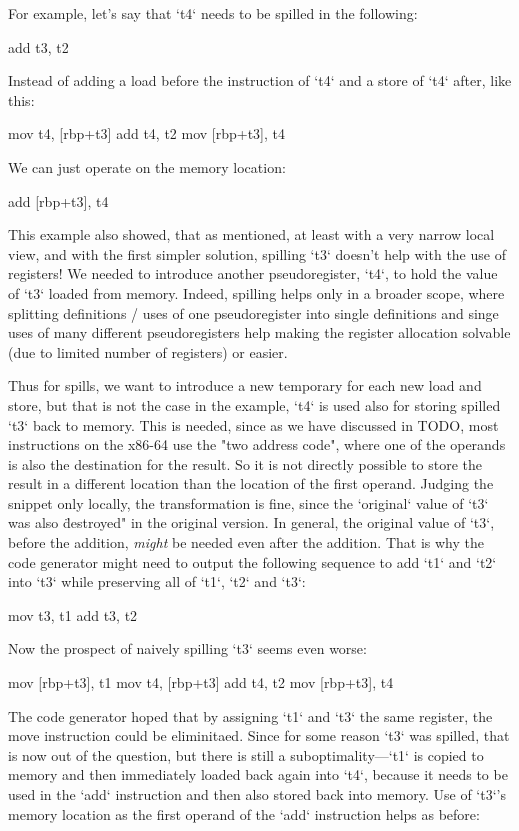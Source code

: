 For example, let's say that `t4` needs to be spilled in the following:

\begtt
add t3, t2
\endtt

Instead of adding a load before the instruction of `t4` and a store of `t4`
after, like this:

\begtt
mov t4, [rbp+t3]
add t4, t2
mov [rbp+t3], t4
\endtt

We can just operate on the memory location:

\begtt
add [rbp+t3], t4
\endtt

This example also showed, that as mentioned, at least with a very narrow local
view, and with the first simpler solution, spilling `t3` doesn't help with the
use of registers! We needed to introduce another pseudoregister, `t4`, to hold
the value of `t3` loaded from memory. Indeed, spilling helps only in a broader
scope, where splitting definitions / uses of one pseudoregister into single
definitions and singe uses of many different pseudoregisters help making the
register allocation solvable (due to limited number of registers) or easier.

Thus for spills, we want to introduce a new temporary for each new load and
store, but that is not the case in the example, `t4` is used also for storing
spilled `t3` back to memory. This is needed, since as we have discussed in TODO,
most instructions on the x86-64 use the "two address code", where one of the
operands is also the destination for the result. So it is not directly possible
to store the result in a different location than the location of the first
operand. Judging the snippet only locally, the transformation is fine, since the
`original` value of `t3` was also \"destroyed" in the original version. In
general, the original value of `t3`, before the addition, {\em might} be needed
even after the addition. That is why the code generator might need to output the
following sequence to add `t1` and `t2` into `t3` while preserving all of `t1`,
`t2` and `t3`:

\begtt
mov t3, t1
add t3, t2
\endtt

Now the prospect of naively spilling `t3` seems even worse:

\begtt
mov [rbp+t3], t1
mov t4, [rbp+t3]
add t4, t2
mov [rbp+t3], t4
\endtt

The code generator hoped that by assigning `t1` and `t3` the same register, the
move instruction could be eliminitaed. Since for some reason `t3` was spilled,
that is now out of the question, but there is still a suboptimality---`t1` is
copied to memory and then immediately loaded back again into `t4`, because it
needs to be used in the `add` instruction and then also stored back into memory.
Use of `t3`'s memory location as the first operand of the `add` instruction
helps as before:

